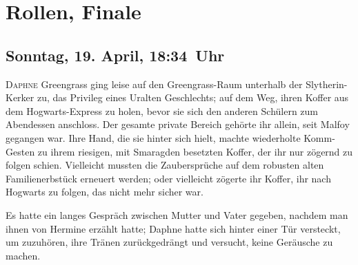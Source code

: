 \chapter{Rollen, Finale}

\section{Sonntag, 19. April, 18:34~Uhr}

\lettrine{D}{aphne} Greengrass ging leise auf den Greengrass-Raum unterhalb der Slytherin-Kerker zu, das Privileg eines Uralten Geschlechts; auf dem Weg, ihren Koffer aus dem Hogwarts-Express zu holen, bevor sie sich den anderen Schülern zum Abendessen anschloss. Der gesamte private Bereich gehörte ihr allein, seit Malfoy gegangen war. Ihre Hand, die sie hinter sich hielt, machte wiederholte Komm-Gesten zu ihrem riesigen, mit Smaragden besetzten Koffer, der ihr nur zögernd zu folgen schien. Vielleicht mussten die Zaubersprüche auf dem robusten alten Familienerbstück erneuert werden; oder vielleicht zögerte ihr Koffer, ihr nach Hogwarts zu folgen, das nicht mehr sicher war.

Es hatte ein langes Gespräch zwischen Mutter und Vater gegeben, nachdem man ihnen von Hermine erzählt hatte; Daphne hatte sich hinter einer Tür versteckt, um zuzuhören, ihre Tränen zurückgedrängt und versucht, keine Geräusche zu machen.

